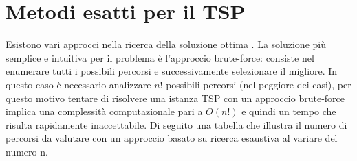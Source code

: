 \documentclass[a4paper,12pt]{report}
\begin{document}
\section{Metodi esatti per il TSP}
Esistono vari approcci nella ricerca della soluzione ottima \cite{Analysis of Brute Force}. La soluzione più semplice e intuitiva per il problema è l'approccio brute-force: consiste nel enumerare tutti i possibili percorsi e successivamente selezionare il migliore. In questo caso è necessario analizzare $n!$ possibili percorsi (nel peggiore dei casi), per questo motivo tentare di risolvere una istanza TSP con un approccio brute-force implica una complessità computazionale pari a $O(n!)$ e quindi un tempo che risulta rapidamente inaccettabile. Di seguito una tabella che illustra il numero di percorsi da valutare con un approccio basato su ricerca esaustiva al variare del numero n.
\end{document}
